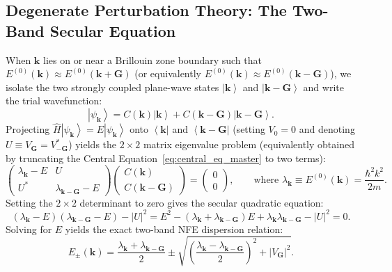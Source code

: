 \documentclass[11pt,a4paper]{article}
\newcommand{\ket}[1]{\left|#1\right\rangle}
\newcommand{\bra}[1]{\left\langle #1\right|}
\newcommand{\abs}[1]{\left|#1\right|}
\newcommand{\hb}{\hbar}
\newcommand{\hbarsq}{\hb^2}
\newcommand{\kk}{\mathbf{k}}
\newcommand{\GG}{\mathbf{G}}
\newcommand{\Ebare}{E^{(0)}}
\begin{document}
\subsection{Degenerate Perturbation Theory: The Two-Band Secular Equation}
When $\kk$ lies on or near a Brillouin zone boundary such that $\Ebare(\kk) \approx \Ebare(\kk+\GG)$ (or equivalently $\Ebare(\kk) \approx \Ebare(\kk-\GG)$), we isolate the two strongly coupled plane-wave states $\ket{\kk}$ and $\ket{\kk-\GG}$ and write the trial wavefunction:
\begin{equation}
    \ket{\psi_{\kk}} = C(\kk)\ket{\kk} + C(\kk-\GG)\ket{\kk-\GG}.
\end{equation}
Projecting $\hat{H}\ket{\psi_{\kk}} = E\ket{\psi_{\kk}}$ onto $\bra{\kk}$ and $\bra{\kk-\GG}$ (setting $V_0 = 0$ and denoting $U \equiv V_{\GG} = V_{-\GG}^*$) yields the $2\times 2$ matrix eigenvalue problem (equivalently obtained by truncating the Central Equation~\eqref{eq:central_eq_master} to two terms):
\begin{equation}
    \begin{pmatrix}
        \lambda_{\kk} - E & U \\
        U^* & \lambda_{\kk-\GG} - E
    \end{pmatrix}
    \begin{pmatrix}
        C(\kk) \\
        C(\kk-\GG)
    \end{pmatrix}
    =
    \begin{pmatrix}
        0 \\
        0
    \end{pmatrix},
    \qquad \text{where } \lambda_{\kk} \equiv \Ebare(\kk) = \frac{\hbarsq k^2}{2m}.
    \label{eq:nfe_2x2_system}
\end{equation}
Setting the $2\times 2$ determinant to zero gives the secular quadratic equation:
\begin{equation}
    (\lambda_{\kk} - E)(\lambda_{\kk-\GG} - E) - \abs{U}^2 = E^2 - (\lambda_{\kk} + \lambda_{\kk-\GG})E + \lambda_{\kk}\lambda_{\kk-\GG} - \abs{U}^2 = 0.
\end{equation}
Solving for $E$ yields the exact two-band NFE dispersion relation:
\begin{equation}
    \boxed{E_\pm(\kk) = \frac{\lambda_{\kk} + \lambda_{\kk-\GG}}{2} \pm \sqrt{\left(\frac{\lambda_{\kk} - \lambda_{\kk-\GG}}{2}\right)^2 + \abs{V_{\GG}}^2}.}
    \label{eq:nfe_general_dispersion}
\end{equation}
\end{document}
